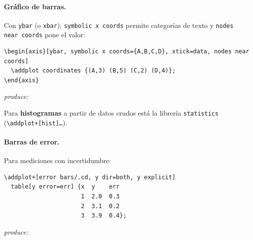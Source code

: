 \documentclass[11pt,a4paper]{article}
\newcommand{\produce}{\par\smallskip\noindent\textit{produce:}\par\smallskip}
\begin{document}
\paragraph{Gráfico de barras.} Con \texttt{ybar} (o \texttt{xbar}); \texttt{symbolic
x coords} permite categorías de texto y \texttt{nodes near coords} pone el valor:
\begin{lstlisting}
\begin{axis}[ybar, symbolic x coords={A,B,C,D}, xtick=data, nodes near coords]
  \addplot coordinates {(A,3) (B,5) (C,2) (D,4)};
\end{axis}
\end{lstlisting}
\produce
\begin{center}
\end{center}
Para \textbf{histogramas} a partir de datos crudos está la librería
\texttt{statistics} (\texttt{\textbackslash addplot+[hist]\dots}).

\paragraph{Barras de error.} Para mediciones con incertidumbre:
\begin{lstlisting}
\addplot+[error bars/.cd, y dir=both, y explicit]
  table[y error=err] {x  y    err
                      1  2.0  0.3
                      2  3.1  0.2
                      3  3.9  0.4};
\end{lstlisting}
\produce
\begin{center}
\end{center}
\end{document}
